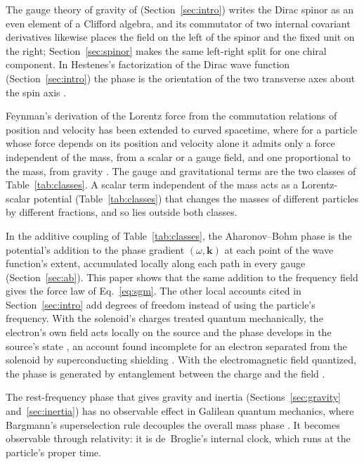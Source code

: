 \documentclass[aps,prd,onecolumn,tightenlines,nofootinbib,notitlepage,11pt,floatfix]{revtex4-2}
\theoremstyle{indentedtheorem}
\begin{document}
The gauge theory of gravity of \citet{LasenbyDoranGull1998Gravity} (Section~\ref{sec:intro}) writes the Dirac spinor as an even element of a Clifford algebra, and its commutator of two internal covariant derivatives likewise places the field on the left of the spinor and the fixed unit on the right; Section~\ref{sec:spinor} makes the same left-right split for one chiral component. In Hestenes's factorization of the Dirac wave function (Section~\ref{sec:intro}) the phase is the orientation of the two transverse axes about the spin axis \citep{Hestenes1990Zitterbewegung}.

Feynman's derivation of the Lorentz force from the commutation relations of position and velocity has been extended to curved spacetime, where for a particle whose force depends on its position and velocity alone it admits only a force independent of the mass, from a scalar or a gauge field, and one proportional to the mass, from gravity \citep{Tanimura1992Relativistic}. The gauge and gravitational terms are the two classes of Table~\ref{tab:classes}. A scalar term independent of the mass acts as a Lorentz-scalar potential (Table~\ref{tab:classes}) that changes the masses of different particles by different fractions, and so lies outside both classes.

In the additive coupling of Table~\ref{tab:classes}, the Aharonov--Bohm phase is the potential's addition to the phase gradient $(\omega,\mathbf{k})$ at each point of the wave function's extent, accumulated locally along each path in every gauge (Section~\ref{sec:ab}). This paper shows that the same addition to the frequency field gives the force law of Eq.~\eqref{eq:sgm}. The other local accounts cited in Section~\ref{sec:intro} add degrees of freedom instead of using the particle's frequency. With the solenoid's charges treated quantum mechanically, the electron's own field acts locally on the source and the phase develops in the source's state \citep{Vaidman2012Role}, an account found incomplete for an electron separated from the solenoid by superconducting shielding \citep{Aharonov2016Nonlocality}. With the electromagnetic field quantized, the phase is generated by entanglement between the charge and the field \citep{Marletto2020Aharonov}.

The rest-frequency phase that gives gravity and inertia (Sections~\ref{sec:gravity} and~\ref{sec:inertia}) has no observable effect in Galilean quantum mechanics, where Bargmann's superselection rule decouples the overall mass phase \citep{Bargmann1954Unitary}. It becomes observable through relativity: it is de~Broglie's internal clock, which runs at the particle's proper time.
\end{document}
